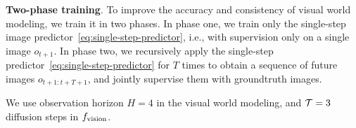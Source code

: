 

\textbf{Two-phase training}.
To improve the accuracy and consistency of visual world modeling, we train it in two phases. In phase one, we train only the single-step image predictor~\eqref{eq:single-step-predictor}, i.e., with supervision only on a single image $o_{t+1}$. In phase two, we recursively apply the single-step predictor~\eqref{eq:single-step-predictor} for $T$ times to obtain a sequence of future images $o_{t+1:t+T+1}$, and jointly supervise them with groundtruth images. 

We use observation horizon $H=4$ in the visual world modeling, and ${\cal T}=3$ diffusion steps in $f_{\text{vision}}$. 


